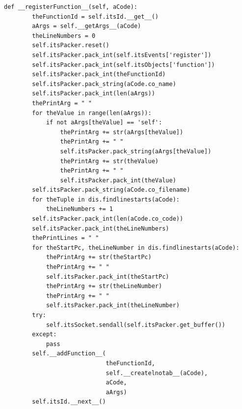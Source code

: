 \documentclass[12pt,legalpaper]{report}
\begin{document}
\begin{singlespace}
\begin{lstlisting}[style=Python]
    def __registerFunction__(self, aCode):
        theFunctionId = self.itsId.__get__()
        aArgs = self.__getArgs__(aCode)
        theLineNumbers = 0
        self.itsPacker.reset()
        self.itsPacker.pack_int(self.itsEvents['register'])
        self.itsPacker.pack_int(self.itsObjects['function'])
        self.itsPacker.pack_int(theFunctionId)
        self.itsPacker.pack_string(aCode.co_name)
        self.itsPacker.pack_int(len(aArgs))
        thePrintArg = " " 
        for theValue in range(len(aArgs)):
            if not aArgs[theValue] == 'self':
                thePrintArg += str(aArgs[theValue])
                thePrintArg += " "
                self.itsPacker.pack_string(aArgs[theValue])
                thePrintArg += str(theValue)
                thePrintArg += " "
                self.itsPacker.pack_int(theValue)
        self.itsPacker.pack_string(aCode.co_filename)
        for theTuple in dis.findlinestarts(aCode):
            theLineNumbers += 1
        self.itsPacker.pack_int(len(aCode.co_code))        
        self.itsPacker.pack_int(theLineNumbers)
        thePrintLines = " "
        for theStartPc, theLineNumber in dis.findlinestarts(aCode):
            thePrintArg += str(theStartPc)
            thePrintArg += " "            
            self.itsPacker.pack_int(theStartPc)
            thePrintArg += str(theLineNumber)
            thePrintArg += " "            
            self.itsPacker.pack_int(theLineNumber)
        try:
            self.itsSocket.sendall(self.itsPacker.get_buffer())
        except:
            pass       
        self.__addFunction__(
                             theFunctionId,
                             self.__createlnotab__(aCode),
                             aCode,
                             aArgs)
        self.itsId.__next__()



\end{lstlisting}
\end{singlespace}
\end{document}
